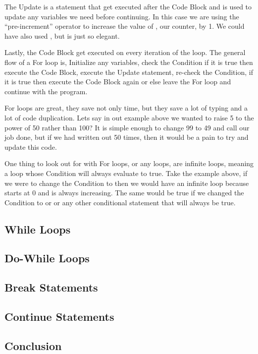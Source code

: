 The Update is a statement that get executed after the Code Block and is used to update any variables we need before continuing.
In this case we are using the ``pre-increment'' operator to increase the value of , our counter, by 1.
We could have also used , but  is just so elegant.
\par

Lastly, the Code Block get executed on every iteration of the loop.
The general flow of a For loop is, Initialize any variables, check the Condition if it is true then execute the Code Block, execute the Update statement, re-check the Condition, if it is true then execute the Code Block again or else leave the For loop and continue with the program.
\par

For loops are great, they save not only time, but they save a lot of typing and a lot of code duplication.
Lets say in out example above we wanted to raise 5 to the power of 50 rather than 100?
It is simple enough to change 99 to 49 and call our job done, but if we had written out  50 times, then it would be a pain to try and update this code.
\par

One thing to look out for with For loops, or any loops, are infinite loops, meaning a loop whose Condition will always evaluate to true.
Take the example above, if we were to change the Condition to  then we would have an infinite loop because  starts at 0 and is always increasing.
The same would be true if we changed the Condition to  or  or any other conditional statement that will always be true.

\subsection{While Loops}

\subsection{Do-While Loops}

\subsection{Break Statements}

\subsection{Continue Statements}

\subsection{Conclusion}
